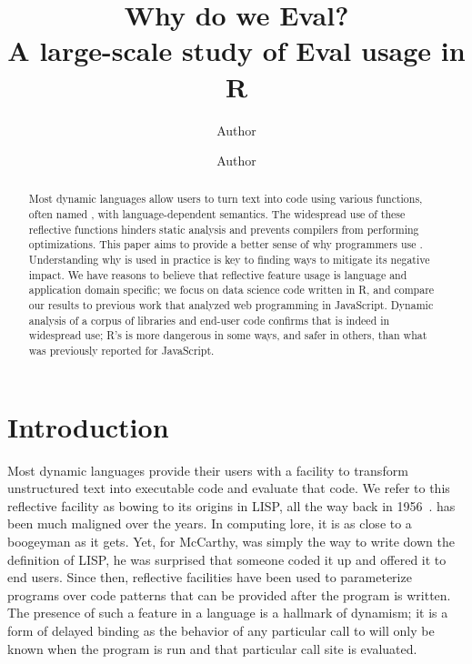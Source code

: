 \documentclass[acmsmall]{acmart}
\begin{document}
	
\title{Why do we Eval?\\\Large A large-scale study of Eval usage in R}

\author{Author }
\orcid{}
\author{Author}
\authornotemark[1]


\begin{abstract}
  \noindent Most dynamic languages allow users to turn text into code
  using various functions, often named \eval, with language-dependent
  semantics. The widespread use of these reflective functions hinders
  static analysis and prevents compilers from performing
  optimizations. This paper aims to provide a better sense of why
  programmers use \eval. Understanding why \eval is used in practice
  is key to finding ways to mitigate its negative impact. We have
  reasons to believe that reflective feature usage is language and
  application domain specific; we focus on data science code written
  in R, and compare our results to previous work that analyzed web
  programming in JavaScript. Dynamic analysis of a corpus of
  \CranAllPackages libraries and \KaggleCode end-user code confirms that
  \eval is indeed in widespread use; R's \eval is more dangerous in
  some ways, and safer in others, than what was previously reported
  for JavaScript.
\end{abstract}

\maketitle

\section{Introduction}

Most dynamic languages provide their users with a facility to
transform unstructured text into executable code and evaluate that
code. We refer to this reflective facility as \eval bowing to its
origins in LISP, all the way back in 1956~\cite{lisp}. \Eval has been
much maligned over the years. In computing lore, it is as close to a
boogeyman as it gets. Yet, for McCarthy, \eval was simply the way to
write down the definition of LISP, he was surprised that someone coded
it up and offered it to end users. Since then, reflective facilities
have been used to parameterize programs over code patterns that can be
provided after the program is written. The presence of such a feature
in a language is a hallmark of dynamism; it is a form of delayed
binding as the behavior of any particular call to \eval will only be
known when the program is run and that particular call site is
evaluated.
\end{document}
